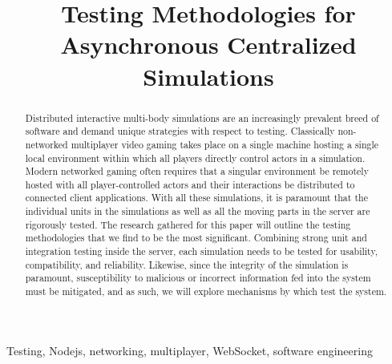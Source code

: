 \documentclass[conference]{IEEEtran}
\begin{document}
\title{Testing Methodologies for Asynchronous Centralized Simulations\\
}

\author{
}

\maketitle

\begin{abstract}
 Distributed interactive multi-body simulations are an increasingly prevalent breed of software and demand unique strategies with respect to testing. 
 Classically non-networked multiplayer video gaming takes place on a single machine hosting a single local environment within which all players directly 
 control actors in a simulation. Modern networked gaming often requires that a singular environment be remotely hosted with all player-controlled actors and 
 their interactions be distributed to connected client applications. With all these simulations, it is paramount that the individual units in the simulations 
 as well as all the moving parts in the server are rigorously tested. The research gathered for this paper will outline the testing methodologies that we find 
 to be the most significant. Combining strong unit and integration testing inside the server, each simulation needs to be tested for usability, compatibility, and 
 reliability. Likewise, since the integrity of the simulation is paramount, susceptibility to malicious or incorrect information fed into the system  must be mitigated, 
 and as such, we will explore mechanisms by which test the system.

\end{abstract}

\begin{IEEEkeywords}
Testing, Nodejs, networking, multiplayer, WebSocket, software engineering
\end{IEEEkeywords}
\end{document}
